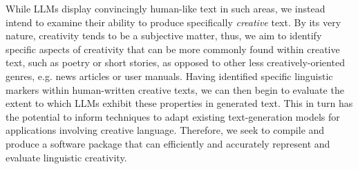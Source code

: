 \documentclass[a4paper,12pt]{article}
\begin{document}
While LLMs display convincingly human-like text in such areas, we instead intend to examine their ability to produce specifically \emph{creative} text. By its very nature, creativity tends to be a subjective matter, thus, we aim to identify specific aspects of creativity that can be more commonly found within creative text, such as poetry or short stories, as opposed to other less creatively-oriented genres, e.g. news articles or user manuals. Having identified specific linguistic markers within human-written creative texts, we can then begin to evaluate the extent to which LLMs exhibit these properties in generated text. This in turn has the potential to inform techniques to adapt existing text-generation models for applications involving creative language. Therefore, we seek to compile and produce a software package that can efficiently and accurately represent and evaluate linguistic creativity. 




\end{document}
